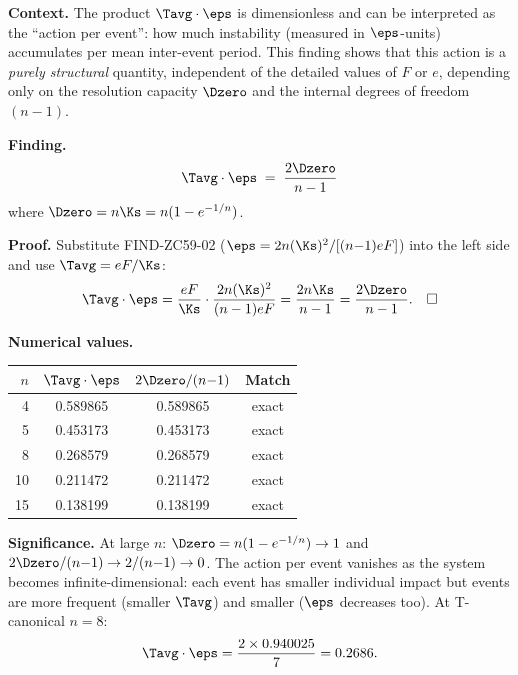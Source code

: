 \documentclass[12pt, a4paper]{article}
\begin{document}
\begin{derivedbox}[title={FIND-ZC61-02: Action Identity
  $\Tavg\cdot\eps = 2\Dzero/(n{-}1)$ ($R_0$, Exact at all $n$)}]

\textbf{Context.}
The product $\Tavg \cdot \eps$ is dimensionless and can be
interpreted as the ``action per event'': how much instability
(measured in $\eps$-units) accumulates per mean inter-event
period.
This finding shows that this action is a \emph{purely
structural} quantity, independent of the detailed values of
$F$ or $e$, depending only on the resolution capacity
$\Dzero$ and the internal degrees of freedom $(n{-}1)$.

\medskip
\textbf{Finding.}
\begin{equation}
  \Tavg \cdot \eps \;=\; \frac{2\Dzero}{n-1}
  \label{eq:action}
\end{equation}
where $\Dzero = n\Ks = n(1-e^{-1/n})$.

\textbf{Proof.}
Substitute FIND-ZC59-02 ($\eps = 2n(\Ks)^2/[(n{-}1)eF]$)
into the left side and use $\Tavg = eF/\Ks$:
\[
  \Tavg \cdot \eps
  = \frac{eF}{\Ks} \cdot \frac{2n(\Ks)^2}{(n-1)eF}
  = \frac{2n\Ks}{n-1}
  = \frac{2\Dzero}{n-1}.
  \quad\square
\]

\textbf{Numerical values.}
\begin{center}
{\small\renewcommand{\arraystretch}{1.25}
\begin{tabular}{@{}rccc@{}}
\toprule
$n$ & $\Tavg\cdot\eps$ & $2\Dzero/(n{-}1)$ & Match \\
\midrule
4  & 0.589865 & 0.589865 & exact \\
5  & 0.453173 & 0.453173 & exact \\
8  & 0.268579 & 0.268579 & exact \\
10 & 0.211472 & 0.211472 & exact \\
15 & 0.138199 & 0.138199 & exact \\
\bottomrule
\end{tabular}
}
\end{center}

\textbf{Significance.}
At large $n$: $\Dzero = n(1-e^{-1/n}) \to 1$ and
$2\Dzero/(n{-}1) \to 2/(n{-}1) \to 0$.
The action per event vanishes as the system becomes
infinite-dimensional: each event has smaller individual
impact but events are more frequent (smaller $\Tavg$) and
smaller ($\eps$ decreases too).
At T-canonical $n=8$:
\[
  \Tavg \cdot \eps = \frac{2 \times 0.940025}{7} = 0.2686.
\]
\end{derivedbox}

\end{document}
